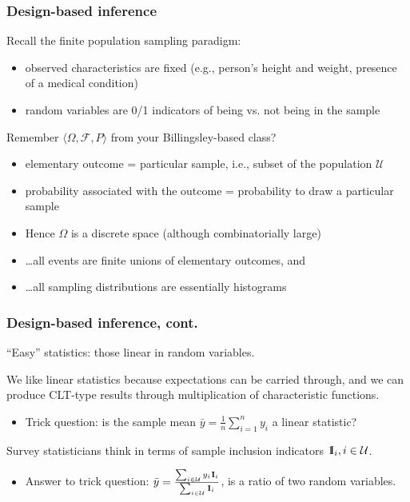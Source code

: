 \documentclass{beamer}
\newcommand{\One}{{\rm 1\kern-0.3em I}}
\begin{document}
\begin{frame}\frametitle{Design-based inference}

Recall the finite population sampling paradigm:
\begin{itemize}
    \item observed characteristics are fixed (e.g., person's height and weight, presence of a medical condition)
    \item random variables are 0/1 indicators of being vs. not being in the sample
\end{itemize}

Remember $\langle \Omega, \mathcal{F}, P \rangle$ from your Billingsley-based class?
\begin{itemize}
    \item elementary outcome = particular sample, i.e., subset of the population $\mathcal U$
    \item probability associated with the outcome = probability to draw a particular sample
    \item Hence $\Omega$ is a discrete space (although combinatorially large)
    \item \ldots all events are finite unions of elementary outcomes, and
    \item \ldots all sampling distributions are essentially histograms
\end{itemize}

\end{frame}

\begin{frame}\frametitle{Design-based inference, cont.}

``Easy'' statistics: those linear in random variables.

\bigskip

We like linear statistics because expectations can be carried through,
and we can produce CLT-type results through multiplication of characteristic functions.

\begin{itemize}
    \item Trick question: is the sample mean $\bar y = \frac 1n\sum_{i=1}^n y_i$ a linear statistic?
\end{itemize}

\bigskip

Survey statisticians think in terms of sample inclusion indicators $\One_i, i\in\mathcal{U}$.

\begin{itemize}
    \item Answer to trick question: $\bar y = \frac{\sum_{i\in\mathcal{U}} y_i \One_i}{\sum_{i\in\mathcal{U}} \One_i}$,
        is a ratio of two random variables.
\end{itemize}

\end{frame}
\end{document}
